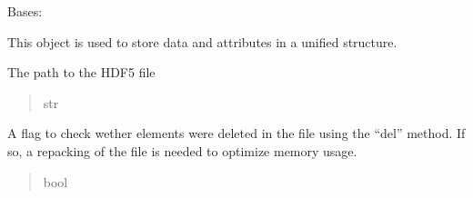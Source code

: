 \documentclass[letterpaper,10pt,english]{sphinxmanual}
\begin{document}
\begin{fulllineitems}
\label{\detokenize{_autosummary/HDF5_BLS.wrapper:HDF5_BLS.wrapper.Wrapper}}
\pysigstartsignatures
\pysiglinewithargsret
{}
{}
{}
\pysigstopsignatures
\sphinxAtStartPar
Bases: 

\sphinxAtStartPar
This object is used to store data and attributes in a unified structure.

\begin{fulllineitems}
\label{\detokenize{_autosummary/HDF5_BLS.wrapper:HDF5_BLS.wrapper.Wrapper.filepath}}
\pysigstartsignatures
\pysigline
{}
\pysigstopsignatures
\sphinxAtStartPar
The path to the HDF5 file
\begin{quote}\begin{description}
\sphinxAtStartPar
str

\end{description}\end{quote}

\end{fulllineitems}


\begin{fulllineitems}
\label{\detokenize{_autosummary/HDF5_BLS.wrapper:HDF5_BLS.wrapper.Wrapper.need_for_repack}}
\pysigstartsignatures
\pysigline
{}
\pysigstopsignatures
\sphinxAtStartPar
A flag to check wether elements were deleted in the file using the “del” method. If so, a repacking of the file is needed to optimize memory usage.
\begin{quote}\begin{description}
\sphinxAtStartPar
bool

\end{description}\end{quote}

\end{fulllineitems}


\end{fulllineitems}
\end{document}
